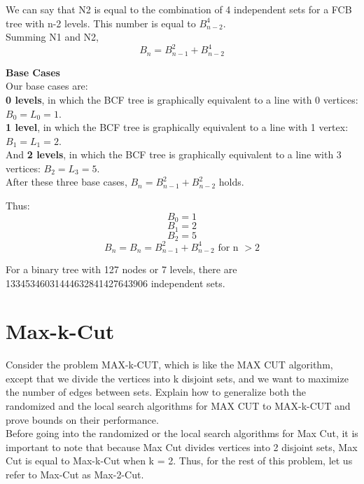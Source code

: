 \documentclass[11pt, solution, letterpaper]{format}
\begin{document}
We can say that N2 is equal to the combination of 4 independent sets for a FCB tree with n-2 levels. This number is equal to $B_{n-2}^4$. \\

Summing N1 and N2, 
$$B_n = B_{n - 1}^2 + B_{n - 2}^4$$

\textbf{Base Cases}\\
Our base cases are: \\
\textbf{0 levels}, in which the BCF tree is graphically equivalent to a line with 0 vertices: $B_0 = L_0 = 1$.\\
\textbf{1 level}, in which the BCF tree is graphically equivalent to a line with 1 vertex: $B_1 = L_1 = 2$.\\
And \textbf{2 levels}, in which the BCF tree is graphically equivalent to a line with 3 vertices: $B_2 = L_3 = 5$.\\


After these three base cases,
$B_n = B_{n - 1}^2 + B_{n - 2}^2$ holds.

Thus:
$$B_0 = 1$$$$B_1 = 2$$$$B_2 = 5$$$$B_n = B_n = B_{n - 1}^2 + B_{n - 2}^4 \text{ for n }> 2$$


For a binary tree with 127 nodes or 7 levels, there are 13345346031444632841427643906 independent sets.


\clearpage
\section{Max-k-Cut}
Consider the problem MAX-k-CUT, which is like the MAX CUT algorithm, except that we divide the vertices
into k disjoint sets, and we want to maximize the number of edges between sets. Explain how to generalize
both the randomized and the local search algorithms for MAX CUT to MAX-k-CUT and prove bounds on
their performance.\\

Before going into the randomized or the local search algorithms for Max Cut, it is important to note that because Max Cut divides vertices into 2 disjoint sets, Max Cut is equal to Max-k-Cut when k = 2. Thus, for the rest of this problem, let us refer to Max-Cut as Max-2-Cut.
\end{document}
